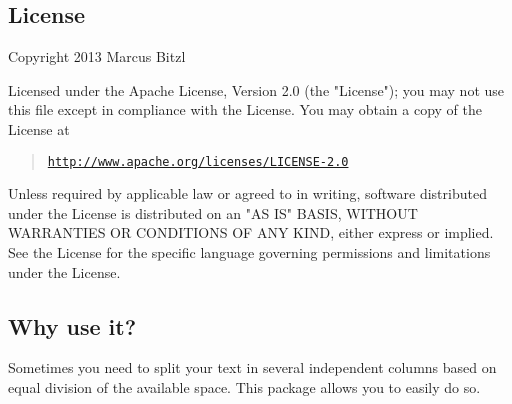 \documentclass[DIV12]{scrartcl}
\begin{document}
\begin{row}[cellsep=0.5cm]{3}
	\begin{cell}{2}
	\section*{License}
	\vspace{-1.5ex}
	Copyright 2013 Marcus Bitzl

	\medskip

	Licensed under the Apache License, Version 2.0 (the "License");
	you may not use this file except in compliance with the License.
	You may obtain a copy of the License at

	\begin{quote}
	\href{http://www.apache.org/licenses/LICENSE-2.0}{\texttt{http://www.apache.org/licenses/LICENSE-2.0}}
	\end{quote}

	Unless required by applicable law or agreed to in writing, software
	distributed under the License is distributed on an "AS IS" BASIS,
	WITHOUT WARRANTIES OR CONDITIONS OF ANY KIND, either express or implied.
	See the License for the specific language governing permissions and
	limitations under the License.
	\end{cell}
	\begin{cell}{1}
	\section*{Why use it?}
	\vspace{-1.5ex}
	Sometimes you need to split your text in several independent columns based on equal division of the available space. This package allows you to easily do so.
	\end{cell}
\end{row}
\end{document}
